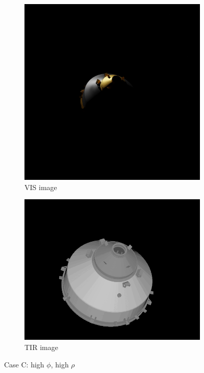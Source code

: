 \begin{figure}[!h]
\centering
\begin{subfigure}{0.2576\linewidth}
    \centering
    \includegraphics[width = \linewidth]{Images/Cas3Vis.png}
    \caption{VIS image}
    \label{fig:Cas3Vis}
\end{subfigure}\quad\quad\quad\quad\quad\quad\quad
\begin{subfigure}{0.32\linewidth}
    \centering
    \includegraphics[width = \linewidth]{Images/Cas3Tir.png}
    \caption{TIR image}
    \label{fig:Cas3Tir}
\end{subfigure}
\caption{Case C: high $\phi$, high $\rho$}
\label{fig:Cas3}
\end{figure}
